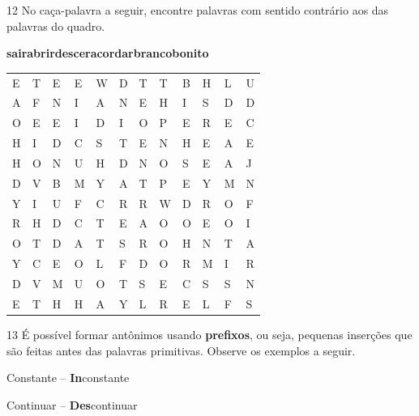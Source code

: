 \num{12} No caça-palavra a seguir, encontre palavras com sentido contrário aos das
palavras do quadro.

\begin{myquote}
\textbf{sair}\hfill \textbf{abrir}\hfill \textbf{descer}\hfill \textbf{acordar}\hfill \textbf{branco}\hfill \textbf{bonito}\hfill
\end{myquote}

\begin{center}
\begin{tabular}{llllllllllll}
E & T & E & E & W & D & T & T & B & H & L & U\\

A & F & N & I & A & N & E & H & I & S & D & D\\

O & E & E & I & D & I & O & P & E & R & E & C\\

H & I & D & C & S & T & E & N & H & E & A & E\\

H & O & N & U & H & D & N & O & S & E & A & J\\

D & V & B & M & Y & A & T & P & E & Y & M & N\\

Y & I & U & F & C & R & R & W & D & R & O & F\\

R & H & D & C & T & E & A & O & O & E & O & I\\

O & T & D & A & T & S & R & O & H & N & T & A\\

Y & C & E & O & L & F & D & O & R & M & I & R\\

D & V & M & U & O & T & S & E & C & S & S & N\\

E & T & H & H & A & Y & L & R & E & L & F & S
\end{tabular}
\end{center}

\num{13} É possível formar antônimos usando \textbf{prefixos}, ou seja, pequenas inserções
que são feitas antes das palavras primitivas. Observe os exemplos a seguir.

\begin{myquote}
Constante -- \textbf{In}constante

Continuar -- \textbf{Des}continuar
\end{myquote}

